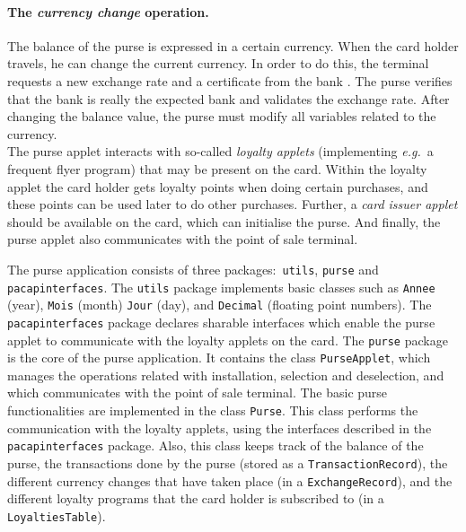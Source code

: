 \documentclass[a4paper]{llncs}
\begin{document}
\paragraph{\bf The \textit{currency change} operation.} The balance
of the purse is expressed in a certain currency. When the card holder
travels, he can change the current currency. In order to do this, the
terminal requests a new exchange rate and a certificate from the bank
. The purse verifies that the bank is really the expected bank and
validates the exchange rate. After changing the balance value, the
purse must modify all variables related to the currency. \\

The purse applet interacts with so-called \textit{loyalty applets}
(implementing \emph{e.g.}~a frequent flyer program) that may be
present on the card. Within the loyalty applet the card holder gets
loyalty points when doing certain purchases, and these points can be
used later to do other purchases. Further, a \textit{card issuer
applet} should be available on the card, which can initialise the
purse. And finally, the purse applet also communicates with the 
point of sale terminal. 

The purse application consists of three packages$:$ \texttt{utils},
\texttt{purse} and \texttt{pacap\-interfaces}. The {\tt utils} package
implements basic classes such as \texttt{Annee} (year), 
\texttt{Mois} (month) \texttt{Jour} (day), and \texttt{Decimal}
(floating point numbers).  The \texttt{pacap\-interfaces} package
declares sharable interfaces which enable the purse applet to
communicate with the loyalty applets on the card.  The \texttt{purse}
package is the core of the purse application.  It contains the class
\texttt{PurseApplet}, which manages the operations related with 
installation, selection and deselection, and which communicates with the
point of sale terminal.  The basic purse functionalities are
implemented in the class
\texttt{Purse}. This class performs the communication
with the loyalty applets, using the interfaces described in the
\texttt{pacapinterfaces} package.  Also, this class keeps track of the 
balance of the purse, the transactions done by the purse (stored as a
\texttt{TransactionRecord}), the different currency changes that have
taken place (in a \texttt{ExchangeRecord}), and the different
loyalty programs that the card holder is subscribed to (in a
\texttt{LoyaltiesTable}). 
\end{document}

